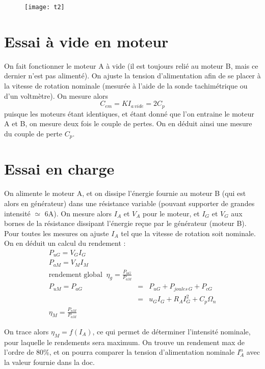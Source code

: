 \documentclass[12pt,prb,aps,epsf]{article}
\begin{document}
\begin{figure}[h]
	\centering \texttt{[image: t2]}
\end{figure}

\section{Essai à vide en moteur}
On fait fonctionner le moteur A à vide (il est toujours relié au moteur B, mais ce dernier n'est pas alimenté). On ajuste la tension d'alimentation afin de se placer à la vitesse de rotation nominale (mesurée à l'aide de la sonde tachimétrique ou d'un voltmètre). On mesure alors 
\begin{equation}
C_{em} = KI_{a\,vide} = 2C_p
\end{equation}
puisque les moteurs étant identiques, et étant donné que l'on entraine le moteur A et B, on mesure deux fois le couple de pertes. On en déduit ainsi une mesure du couple de perte $C_p$.

\section{Essai en charge}
On alimente le moteur A, et on dissipe l'énergie fournie au moteur B (qui est alors en générateur) dans une résistance variable (pouvant supporter de grandes intensité $\simeq$ 6A). On mesure alors $I_A$ et $V_A$ pour le moteur, et $I_G$ et $V_G$ aux bornes de la résistance dissipant l'énergie reçue par le générateur (moteur B). Pour toutes les mesures on ajuste $I_A$ tel que la vitesse de rotation soit nominale.\\

On en déduit un calcul du rendement :
\begin{eqnarray}
P_{uG} = V_GI_G\\
P_{aM} = V_MI_M\\
\mathrm{rendement\;global}\;\; \eta_g = \frac{P_{uG}}{P_{aM}}\\
P_{uM} = P_{aG} &=& P_{uG} + P_{joules\,G} + P_{cG}\\
&=& u_{G}I_G + R_AI_G^2 + C_p\Omega_n\\
\eta_M = \frac{P_{uM}}{P_{aM}}
\end{eqnarray}

On trace alors $\eta_M = f(I_A)$, ce qui permet de déterminer l'intensité nominale, pour laquelle le rendements sera maximum. On trouve un rendement max de l'ordre de 80\%, et on pourra comparer la tension d'alimentation nominale $I_A^n$ avec la valeur fournie dans la doc.
\end{document}
